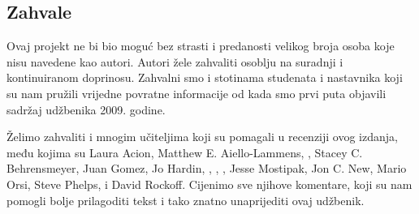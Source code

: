 \subsection*{{\color{oiB}Zahvale}}


Ovaj projekt ne bi bio moguć bez strasti i predanosti
velikog broja osoba koje nisu navedene kao autori.
Autori žele zahvaliti osoblju
na suradnji i kontinuiranom doprinosu.
Zahvalni smo i stotinama studenata i
nastavnika koji su nam pružili vrijedne povratne informacije
od kada smo prvi puta objavili sadržaj udžbenika 2009. godine.


\vspace{3mm}

\noindent%
Želimo zahvaliti i mnogim učiteljima koji su pomagali u recenziji ovog izdanja, među kojima su
Laura Acion,
{Matthew E. Aiello-Lammens},
,
Stacey C. Behrensmeyer,
Juan Gomez,
Jo Hardin,
,
,
,
Jesse Mostipak,
Jon C. New,
Mario Orsi,
Steve Phelps,
i David Rockoff.
Cijenimo sve njihove komentare, koji su nam pomogli bolje prilagoditi tekst i tako znatno unaprijediti ovaj udžbenik.



